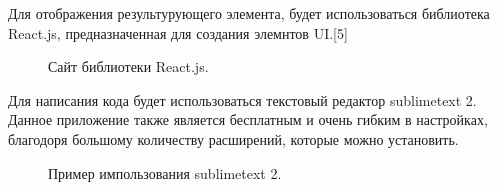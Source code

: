 \documentclass[14pt,a4paper]{extreport}
\begin{document}
     \newpage
     \par Для отображения результурующего элемента, будет использоваться библиотека React.js, предназначенная для создания элемнтов UI.[5]
    \begin{figure}[h]
    \caption{Сайт библиотеки React.js.}
    \label{ris:image}
    \end{figure}
    \newpage
     \par Для написания кода будет использоваться текстовый редактор sublimetext 2. Данное приложение также является бесплатным и очень гибким в настройках, благодоря большому количеству расширений, которые можно установить.
    \begin{figure}[h]
    \caption{Пример импользования sublimetext 2.}
    \label{ris:image}
    \end{figure}
	\newpage
\end{document}
